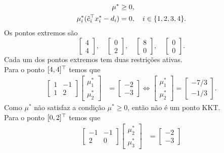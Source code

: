 \begin{questions}
\begin{solution}
\begin{align*}
        \mu^* &\ge 0,\\
        \mu_i^*(\Tilde{c}_i^\top x_i^*-d_i) &= 0, \quad i\in\{1,2,3,4\}.
    \end{align*}
    Os pontos extremos são
    \[
    \begin{bmatrix} 4\\ 4\end{bmatrix},\quad
    \begin{bmatrix} 0\\ 2\end{bmatrix},\quad
    \begin{bmatrix} 8\\ 0\end{bmatrix},\quad
    \begin{bmatrix} 0\\ 0\end{bmatrix}.
    \]
    Cada um dos pontos extremos tem duas restrições ativas.\\
    Para o ponto $[4,4]^\top$ temos que
        \begin{align*}
        \begin{bmatrix} 1 & -1 \\ 1 & 2 \end{bmatrix}\begin{bmatrix} \mu_1^*\\ \mu_2^*\end{bmatrix} &= \begin{bmatrix} -2\\ -3 \end{bmatrix}
        \Leftrightarrow \begin{bmatrix} \mu_1^*\\ \mu_2^*\end{bmatrix} = \begin{bmatrix} -7/3\\ -1/3\end{bmatrix}.
    \end{align*}
    Como $\mu^*$ não satisfaz a condição $\mu^* \ge 0$, então não é um ponto KKT.\\
    Para o ponto $[0,2]^\top$ temos que
        \begin{align*}
        \begin{bmatrix} -1 & -1 \\ 2 & 0 \end{bmatrix}\begin{bmatrix} \mu_2^*\\ \mu_3^*\end{bmatrix} &= \begin{bmatrix} -2\\ -3 \end{bmatrix}

\end{align*}
\end{solution}
\end{questions}
